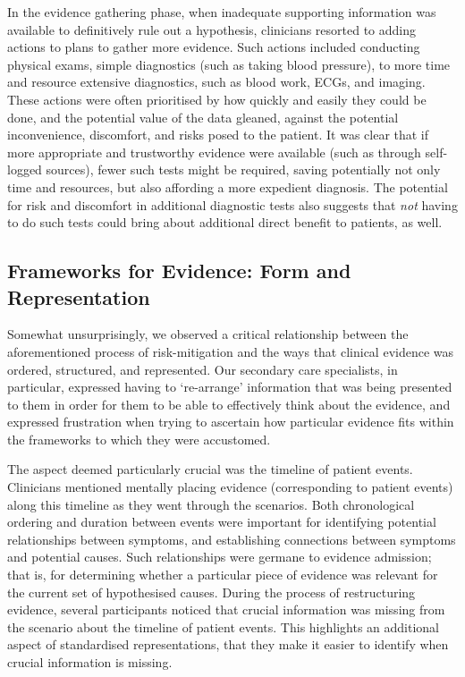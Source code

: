 \documentclass{sigchi}
\begin{document}
In the evidence gathering phase, when inadequate supporting information was available to definitively rule out a hypothesis, clinicians resorted to adding actions to plans to gather more evidence.  Such actions included conducting physical exams, simple diagnostics (such as taking blood pressure), to more time and resource extensive diagnostics, such as blood work, ECGs, and imaging.  These actions were often prioritised by how quickly and easily they could be done, and the potential value of the data gleaned, against the potential inconvenience, discomfort, and risks posed to the patient.  It was clear that if more appropriate and trustworthy evidence were available (such as through self-logged sources), fewer such tests might be required, saving potentially not only time and resources, but also affording a more expedient diagnosis.  The potential for risk and discomfort in additional diagnostic tests also suggests that \emph{not} having to do such tests could bring about additional direct benefit to patients, as well. 

\subsection{Frameworks for Evidence: Form and Representation}

Somewhat unsurprisingly, we observed a critical relationship between the aforementioned process of risk-mitigation and the ways that clinical evidence was ordered, structured, and represented. Our  secondary care specialists, in particular, expressed having to `re-arrange' information that was being presented to them in order for them to be able to effectively think about the evidence, and expressed frustration when trying to ascertain how particular evidence fits within the frameworks to which they were accustomed.

The aspect deemed particularly crucial was the timeline of patient events.  Clinicians mentioned mentally placing evidence (corresponding to patient events) along this timeline as they went through the scenarios. Both chronological ordering and duration between events were important for identifying potential relationships between symptoms, and establishing connections between symptoms and potential causes.   Such relationships were germane to evidence admission; that is, for determining whether a particular piece of evidence was relevant for the current set of hypothesised causes. During the process of restructuring evidence, several participants noticed that crucial information was missing from the scenario about the timeline of patient events.  This highlights an additional aspect of standardised representations, that they make it easier to identify when crucial information is missing.
\end{document}
